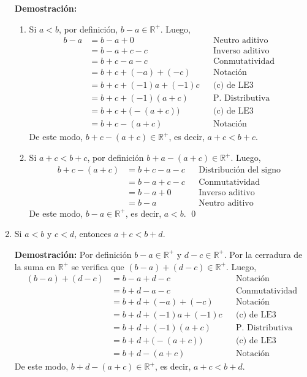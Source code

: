 \documentclass[11pt]{article}
\newcommand{\R}{\mathbb{R}}
\begin{document}
\begin{enumerate}[label=\alph*)]
    \textbf{Demostración:} \begin{enumerate}[label=\roman*)]
    \item Si $a<b$, por definición, $b-a \in \R^+$. Luego, \begin{align*}
        b - a &= b -a + 0 && \text{Neutro aditivo}\\
        &= b-a+c-c && \text{Inverso aditivo}\\
        &= b+c-a-c && \text{Conmutatividad}\\
        &= b+c+(-a)+(-c) && \text{Notación}\\
        &= b+c+(-1)a+(-1)c && \text{(c) de LE3}\\
        &= b+c+(-1)(a+c) && \text{P. Distributiva}\\
        &= b+c+\big(-(a+c)\big) && \text{(c) de LE3}\\
        &= b+c-(a+c) && \text{Notación}
        \end{align*} De este modo, $b+c-(a+c)\in \R^+$, es decir, $a+c<b+c$.
    \item Si $a+c<b+c$, por definición $b+a-(a+c)\in \R^+$. Luego, \begin{align*}
        b+c-(a+c) &= b+c-a-c && \text{Distribución del signo}\\
        &= b-a+c-c && \text{Conmutatividad}\\
        &= b-a+0 && \text{Inverso aditivo}\\
        &= b-a && \text{Neutro aditivo}
    \end{align*} De este modo, $b-a\in \R^+$, es decir, $a<b$. \qed
    \end{enumerate}

    \item Si $a<b$ y $c < d$, entonces $a+c<b+d$.
    
    \textbf{Demostración:} Por definición $b-a\in \R^+$ y $d-c\in \R^+$. Por la cerradura de la suma en $\R^+$ se verifica que $(b-a)+(d-c) \in \R^+$. Luego, \begin{align*}
        (b-a)+(d-c) &= b-a+d-c && \text{Notación}\\
        &= b+d-a-c && \text{Conmutatividad}\\
        &= b+d+(-a)+(-c) && \text{Notación}\\
        &= b+d+(-1)a+(-1)c && \text{(c) de LE3}\\
        &= b+d+ (-1) (a + c) && \text{P. Distributiva}\\
        &= b+d +\big(-(a+c) \big) && \text{(c) de LE3}\\
        &= b+d - (a+c) && \text{Notación}
        \end{align*}
    De este modo, $b+d-(a+c)\in \R^+$, es decir, $a+c<b+d$.


\end{enumerate}
\end{document}
